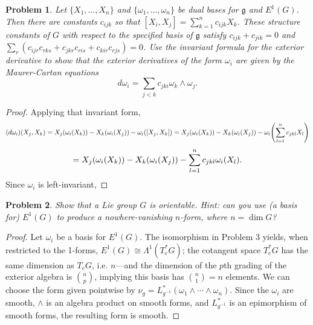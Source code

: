 \documentclass{article}
\newtheorem{plm}{Problem}
\begin{document}
\begin{plm}
  Let $\{X_{1}, \ldots, X_{n}\}$ and $\{\omega_{1}, \ldots, \omega_{n}\}$ be dual bases for $\mathfrak{g}$ and $E^{1}(G)$.
  Then there are constants $c_{ijk}$ so that $[X_{i}, X_{j}] = \sum_{k = 1}^{n}c_{ijk}X_{k}$.
  These \textit{structure constants} of $G$ with respect to the specified basis of $\mathfrak{g}$ satisfy $c_{ijk} + c_{jik} = 0$
  and $\sum_{r}(c_{ijr}c_{rks} + c_{jkr}c_{ris} + c_{kir}c_{rjs}) = 0$.
  Use the invariant formula for the exterior derivative to show that the exterior derivatives of the form $\omega_{i}$
  are given by the \textit{Maurer-Cartan} equations
  \[
    d\omega_{i} = \sum_{j < k}c_{jki}\omega_{k} \wedge \omega_{j}.
  \]
\end{plm}

\begin{proof}
  Applying that invariant form,
  \[
    (d\omega_{i})(X_{j}, X_{k}) = X_{j}(\omega_{i}(X_{k})) - X_{k}(\omega_{i}(X_{j})) - \omega_{i}([X_{j}, X_{k}])
    = X_{j}(\omega_{i}(X_{k})) - X_{k}(\omega_{i}(X_{j})) - \omega_{i}\qty(\sum_{l = 1}^{n}c_{jkl}X_{l})
  \]
  \[
    = X_{j}(\omega_{i}(X_{k})) - X_{k}(\omega_{i}(X_{j})) - \sum_{l = 1}^{n}c_{jkl}\omega_{i}\qty(X_{l}).
  \]
  Since $\omega_{i}$ is left-invariant, %
\end{proof}

\begin{plm}
  Show that a Lie group $G$ is orientable. Hint: can you use (a basis for) $E^{1}(G)$ to produce a nowhere-vanishing $n$-form,
  where $n = \dim G$?
\end{plm}

\begin{proof}
  Let $\omega_{i}$ be a basis for $E^{1}(G)$.
  The isomorphism in Problem 3 yields, when restricted to the 1-forms, $E^{1}(G) \cong \Lambda^{1}(T_{e}^{*}G)$;
  the cotangent space $T_{e}^{*}G$ has the same dimension as $T_{e}G$, i.e. $n$---and
  the dimension of the $p$th grading of the exterior algebra is $\binom{n}{p}$, implying this basis has $\binom{n}{1} = n$ elements.
  We can choose the form given pointwise by $\nu_{g} = L_{g^{-1}}^{*}(\omega_{1} \wedge \cdots \wedge \omega_{n})$.
  Since the $\omega_{i}$ are smooth, $\wedge$ is an algebra product on smooth forms, and $L_{g^{-1}}^{*}$ is an epimorphism of smooth forms,
  the resulting form is smooth.

\end{proof}
\end{document}
